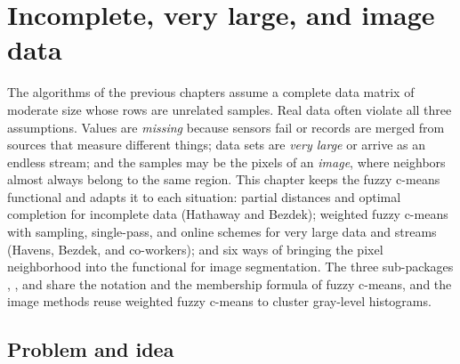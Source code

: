 \chapter{Incomplete, very large, and image data}\label{ch:data_realities}
\begin{roadmap}
The algorithms of the previous chapters assume a complete data matrix of moderate size whose rows are unrelated samples. Real data often violate all three assumptions. Values are \emph{missing} because sensors fail or records are merged from sources that measure different things; data sets are \emph{very large} or arrive as an endless stream; and the samples may be the pixels of an \emph{image}, where neighbors almost always belong to the same region. This chapter keeps the fuzzy c-means functional and adapts it to each situation: partial distances and optimal completion for incomplete data (Hathaway and Bezdek); weighted fuzzy c-means with sampling, single-pass, and online schemes for very large data and streams (Havens, Bezdek, and co-workers); and six ways of bringing the pixel neighborhood into the functional for image segmentation. The three sub-packages , , and  share the notation and the membership formula of fuzzy c-means, and the image methods reuse weighted fuzzy c-means to cluster gray-level histograms.
\end{roadmap}

\section{Problem and idea}\label{sec:data:problem}

